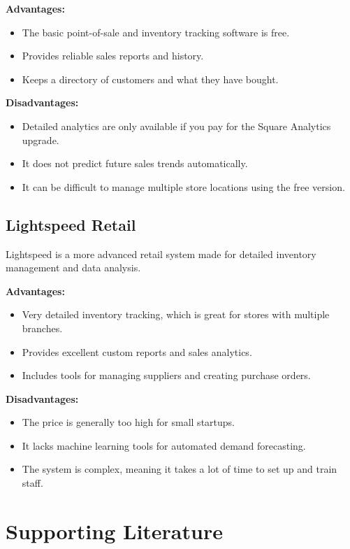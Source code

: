 \documentclass[12pt,a4paper]{report}
\begin{document}
\textbf{Advantages:}
\begin{itemize}
    \item The basic point-of-sale and inventory tracking software is free.
    \item Provides reliable sales reports and history.
    \item Keeps a directory of customers and what they have bought.
\end{itemize}

\textbf{Disadvantages:}
\begin{itemize}
    \item Detailed analytics are only available if you pay for the Square Analytics upgrade.
    \item It does not predict future sales trends automatically.
    \item It can be difficult to manage multiple store locations using the free version.
\end{itemize}

\subsection{Lightspeed Retail}
Lightspeed is a more advanced retail system made for detailed inventory management and data analysis.

\textbf{Advantages:}
\begin{itemize}
    \item Very detailed inventory tracking, which is great for stores with multiple branches.
    \item Provides excellent custom reports and sales analytics.
    \item Includes tools for managing suppliers and creating purchase orders.
\end{itemize}

\textbf{Disadvantages:}
\begin{itemize}
    \item The price is generally too high for small startups.
    \item It lacks machine learning tools for automated demand forecasting.
    \item The system is complex, meaning it takes a lot of time to set up and train staff.
\end{itemize}

\section{Supporting Literature}
\end{document}
